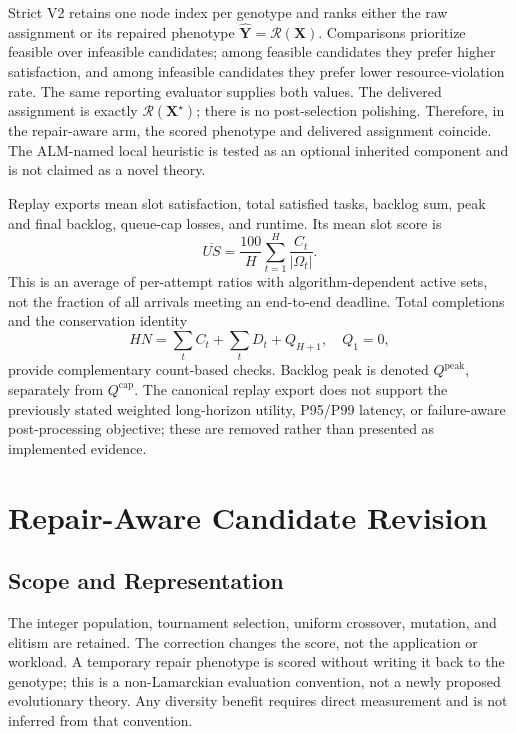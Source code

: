 \documentclass[pdflatex,sn-mathphys-num]{sn-jnl}
\begin{document}
Strict V2 retains one node index per genotype and ranks either the raw assignment or its repaired phenotype $\widehat{\mathbf{Y}}=\mathcal{R}(\mathbf{X})$. Comparisons prioritize feasible over infeasible candidates; among feasible candidates they prefer higher satisfaction, and among infeasible candidates they prefer lower resource-violation rate. The same reporting evaluator supplies both values. The delivered assignment is exactly $\mathcal{R}(\mathbf{X}^{\star})$; there is no post-selection polishing. Therefore, in the repair-aware arm, the scored phenotype and delivered assignment coincide. The ALM-named local heuristic is tested as an optional inherited component and is not claimed as a novel theory.

Replay exports mean slot satisfaction, total satisfied tasks, backlog sum, peak and final backlog, queue-cap losses, and runtime. Its mean slot score is
\begin{equation}
 \overline{US}=\frac{100}{H}\sum_{t=1}^{H}\frac{C_t}{|\Omega_t|}.
\end{equation}
This is an average of per-attempt ratios with algorithm-dependent active sets, not the fraction of all arrivals meeting an end-to-end deadline. Total completions and the conservation identity
\begin{equation}
 HN=\sum_t C_t+\sum_t D_t+Q_{H+1},\quad Q_1=0,
\end{equation}
provide complementary count-based checks. Backlog peak is denoted $Q^{\mathrm{peak}}$, separately from $Q^{\mathrm{cap}}$. The canonical replay export does not support the previously stated weighted long-horizon utility, P95/P99 latency, or failure-aware post-processing objective; these are removed rather than presented as implemented evidence.



\section{Repair-Aware Candidate Revision}
\subsection{Scope and Representation}
The integer population, tournament selection, uniform crossover, mutation, and elitism are retained. The correction changes the score, not the application or workload. A temporary repair phenotype is scored without writing it back to the genotype; this is a non-Lamarckian evaluation convention, not a newly proposed evolutionary theory. Any diversity benefit requires direct measurement and is not inferred from that convention.
\end{document}
